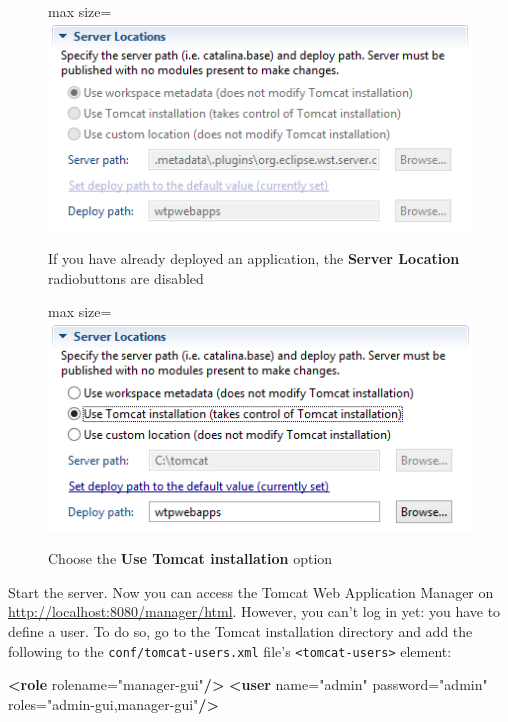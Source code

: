 \documentclass[]{report}
\newenvironment{Shaded}{}{}
\newcommand{\KeywordTok}[1]{\textcolor[rgb]{0.00,0.44,0.13}{\textbf{{#1}}}}
\newcommand{\StringTok}[1]{\textcolor[rgb]{0.25,0.44,0.63}{{#1}}}
\newcommand{\OtherTok}[1]{\textcolor[rgb]{0.00,0.44,0.13}{{#1}}}
\let\Oldincludegraphics\includegraphics
\renewcommand{\includegraphics}[1]{
\begin{adjustbox}{max size={\textwidth}{\textheight}}
    \Oldincludegraphics[scale=0.6]{#1}%
\end{adjustbox}
}
\begin{document}
\begin{figure}[htbp]
\centering
\includegraphics{img/web_services/server_settings_1.png}
\caption{If you have already deployed an application, the \textbf{Server
Location} radiobuttons are disabled}
\end{figure}

\begin{figure}[htbp]
\centering
\includegraphics{img/web_services/server_settings_2.png}
\caption{Choose the \textbf{Use Tomcat installation} option}
\end{figure}

Start the server. Now you can access the Tomcat Web Application Manager
on \url{http://localhost:8080/manager/html}. However, you can't log in
yet: you have to define a user. To do so, go to the Tomcat installation
directory and add the following to the \texttt{conf/tomcat-users.xml}
file's \texttt{\textless{}tomcat-users\textgreater{}} element:

\begin{Shaded}
\begin{Highlighting}[]
\KeywordTok{<role}\OtherTok{ rolename=}\StringTok{"manager-gui"}\KeywordTok{/>}
\KeywordTok{<user}\OtherTok{ name=}\StringTok{"admin"}\OtherTok{ password=}\StringTok{"admin"}\OtherTok{ roles=}\StringTok{"admin-gui,manager-gui"}\KeywordTok{/>}
\end{Highlighting}
\end{Shaded}
\end{document}

